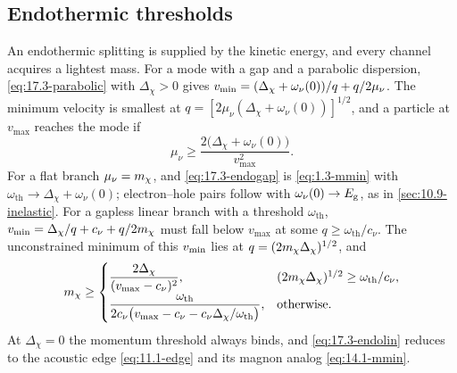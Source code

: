 \subsection{Endothermic thresholds}\label{sec:17.3-endo}

An endothermic splitting is supplied by the kinetic energy, and every channel acquires a lightest mass. For a mode with a gap and a parabolic dispersion, \cref{eq:17.3-parabolic} with $\Delta_\chi > 0$ gives $v_{\mathrm{min}} = (\Delta_\chi + \omega_\nu(0))/q + q/2\mu_\nu$. The minimum velocity is smallest at $q = [2\mu_\nu(\Delta_\chi + \omega_\nu(0))]^{1/2}$, and a particle at $v_{\mathrm{max}}$ reaches the mode if
\begin{equation}
  \mu_\nu \ge \frac{2\bigl(\Delta_\chi + \omega_\nu(0)\bigr)}{v_{\mathrm{max}}^2} .
  \label{eq:17.3-endogap}
\end{equation}
For a flat branch $\mu_\nu = m_{\chi}$, and \cref{eq:17.3-endogap} is \cref{eq:1.3-mmin} with $\omega_{\mathrm{th}} \to \Delta_\chi + \omega_\nu(0)$; electron--hole pairs follow with $\omega_\nu(0) \to E_{\mathrm{g}}$, as in \cref{sec:10.9-inelastic}. For a gapless linear branch with a threshold $\omega_{\mathrm{th}}$, $v_{\mathrm{min}} = \Delta_\chi/q + c_\nu + q/2m_{\chi}$ must fall below $v_{\mathrm{max}}$ at some $q \ge \omega_{\mathrm{th}}/c_\nu$. The unconstrained minimum of this $v_{\mathrm{min}}$ lies at $q = (2m_{\chi}\Delta_\chi)^{1/2}$, and
\begin{equation}
  m_{\chi} \ge
  \begin{cases}
    \dfrac{2\Delta_\chi}{(v_{\mathrm{max}} - c_\nu)^2} , & (2m_{\chi}\Delta_\chi)^{1/2} \ge \omega_{\mathrm{th}}/c_\nu , \\[1.5ex]
    \dfrac{\omega_{\mathrm{th}}}{2c_\nu\bigl(v_{\mathrm{max}} - c_\nu - c_\nu\Delta_\chi/\omega_{\mathrm{th}}\bigr)} , & \text{otherwise} .
  \end{cases}
  \label{eq:17.3-endolin}
\end{equation}
At $\Delta_\chi = 0$ the momentum threshold always binds, and \cref{eq:17.3-endolin} reduces to the acoustic edge \cref{eq:11.1-edge} and its magnon analog \cref{eq:14.1-mmin}.


